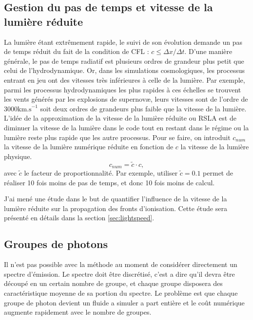 \subsection{Gestion du pas de temps et vitesse de la lumière réduite}
\label{sec:RSLA}

La lumière étant extrêmement rapide, le suivi de son évolution demande un pas de temps réduit du fait de la condition de \ac{CFL} : $ c \leq \Delta x / \Delta t $.
D'une manière générale, le pas de temps radiatif est plusieurs ordres de grandeur plus petit que celui de l'hydrodynamique.
Or, dans les simulations cosmologiques, les processus entrant en jeu ont des vitesses très inférieures à celle de la lumière.
Par exemple, parmi les processus hydrodynamiques les plus rapides à ces échelles se trouvent les vents générés par les explosions de supernovæ, leurs vitesses sont de l'ordre de $3000 \mathrm{km.s}^{-1}$ soit deux ordres de grandeurs plus faible que la vitesse de la lumière.
L'idée de la approximation de la vitesse de la lumière réduite ou \ac{RSLA} est de diminuer la vitesse de la lumière dans le code tout en restant dans le régime ou la lumière reste plus rapide que les autre processus.
Pour se faire, on introduit $c_{num}$ la vitesse de la lumière numérique réduite en fonction de $c$ la vitesse de la lumière physique.
\begin{equation}
c_{num} = \tilde{c} \cdot{c},
\end{equation}
avec $\tilde{c}$ le facteur de proportionnalité. 
Par exemple, utiliser $\tilde{c}=0.1$ permet de réaliser 10 fois moins de pas de temps, et donc 10 fois moins de calcul.

J'ai mené une étude dans le but de quantifier l'influence de la vitesse de la lumière réduite sur la propagation des fronts d'ionisation.
Cette étude sera présenté en détails dans la section \ref{sec:lightspeed}.


\subsection{Groupes de photons}
\label{sec:groupedephotons}

Il n'est pas possible avec la méthode au moment de considérer directement un spectre d'émission.
Le spectre doit être discrétisé, c'est a dire qu'il devra être découpé en un certain nombre de groupe, et chaque groupe disposera des caractéristique moyenne de sa portion du spectre.
Le problème est que chaque groupe de photon devient un fluide a simuler a part entière et le coût numérique augmente rapidement avec le nombre de groupes. 

